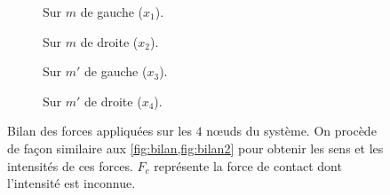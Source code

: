 \begin{figure}[!h]
    \begin{subfigure}[b]{0.30\textwidth}
        \centering
        \caption{Sur $m$ de gauche ($x_1$).}
        \label{fig:bilan13}
    \end{subfigure}
    \begin{subfigure}[b]{0.42\textwidth}
        \centering
        \caption{Sur $m$ de droite ($x_2$).}
        \label{fig:bilan23}
    \end{subfigure}
    \begin{subfigure}[b]{0.423\textwidth}
        \centering
        \caption{Sur $m'$ de gauche ($x_3$).}
        \label{fig:bilan33}
    \end{subfigure}
    \begin{subfigure}[b]{0.297\textwidth}
        \centering
        \caption{Sur $m'$ de droite ($x_4$).}
        \label{fig:bilan43}
    \end{subfigure}
       \caption{Bilan des forces appliquées sur les $4$ n\oe{}uds du système. On procède de façon similaire aux \cref{fig:bilan,fig:bilan2} pour obtenir les sens et les intensités de ces forces. $F_c$ représente la force de contact dont l'intensité est inconnue.}
       \label{fig:bilan3}
\end{figure}

